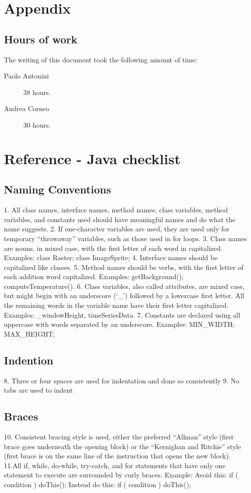 \chapter{Appendix}\label{chap:appendix}

\section{Hours of work}
The writing of this document took the following amount of time:

\begin{description}
	\item [Paolo Antonini] 38 hours.
	\item [Andrea Corneo] 30 hours.
\end{description}



\chapter{Reference - Java checklist}
\section{Naming Conventions}
1. All class names, interface names, method names, class variables, method variables, and constants used should have meaningful names and do what the name suggests.
2. If one-character variables are used, they are used only for temporary “throwaway” variables, such as those used in for loops.
3. Class names are nouns, in mixed case, with the first letter of each word in capitalized. Examples: class Raster; class ImageSprite;
4. Interface names should be capitalized like classes.
5. Method names should be verbs, with the first letter of each addition word
capitalized. Examples: getBackground(); computeTemperature().
6. Class variables, also called attributes, are mixed case, but might begin with an underscore (‘\_’) followed by a lowercase first letter. All the remaining words in the variable name have their first letter capitalized.
Examples: \_windowHeight, timeSeriesData.
7. Constants are declared using all uppercase with words separated by an
underscore. Examples: MIN\_WIDTH; MAX\_HEIGHT;
\section{Indention}
8. Three or four spaces are used for indentation and done so consistently
9. No tabs are used to indent
\section{Braces}
10. Consistent bracing style is used, either the preferred “Allman” style (first brace goes underneath the opening block) or the “Kernighan and Ritchie” style (first brace is on the same line of the instruction that opens the new block).
11.All if, while, do-while, try-catch, and for statements that have only one statement to execute are surrounded by curly braces. Example:
Avoid this:
if ( condition )
doThis(); Instead do this:
if ( condition ) {
doThis(); }
